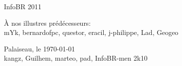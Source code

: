 \thispagestyle{empty}

\begin{center}
\begin{Huge}
InfoBR 2011
\end{Huge}
\end{center}


\begin{flushright}
\begin{large} 
 { \selectfont
\`A nos illustres pr\'ed\'ecesseurs:\\
\smallskip
mYk, bernardofpc, questor, eracil, j-philippe, Lad, Geogeo \\ }
\end{large}
\vspace{1cm}
{Palaiseau, le \today \\
\medskip
 kangz, Guilhem, marteo, pad, InfoBR-men 2k10  }
\end{flushright} 



\newpage
\thispagestyle{empty}
\vspace*{1cm}
\newpage

